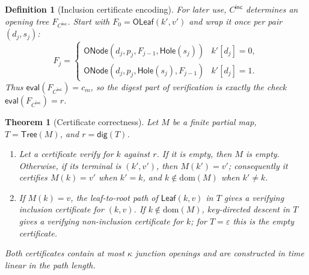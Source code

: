 \documentclass[twocolumn]{article}
\newtheorem{definition}{Definition}
\newtheorem{theorem}{Theorem}
\begin{document}
\begin{definition}[Inclusion certificate encoding]
For later use, $C^\mathsf{inc}$ determines an opening tree $F_{C^\mathsf{inc}}$. Start with $F_0=\mathsf{OLeaf}(k',v')$ and wrap it once per pair $(d_j,s_j)$:
\[
F_j=\begin{cases}
\mathsf{ONode}(d_j,p_j,F_{j-1},\mathsf{Hole}(s_j)) & k'[d_j]=0,\\
\mathsf{ONode}(d_j,p_j,\mathsf{Hole}(s_j),F_{j-1}) & k'[d_j]=1.
\end{cases}
\]
Thus $\mathsf{eval}(F_{C^\mathsf{inc}})=c_m$, so the digest part of verification is exactly the check $\mathsf{eval}(F_{C^\mathsf{inc}})=r$.
\end{definition}

\begin{theorem}[Certificate correctness]
\label{thm:inclusion-cert}
Let $M$ be a finite partial map, $T=\mathsf{Tree}(M)$, and $r=\mathsf{dig}(T)$.
\begin{enumerate}[nosep,label=(\roman*)]
  \item Let a certificate verify for $k$ against $r$. If it is empty, then $M$ is empty. Otherwise, if its terminal is $(k',v')$, then $M(k')=v'$; consequently it certifies $M(k)=v'$ when $k'=k$, and $k\notin\mathrm{dom}(M)$ when $k'\neq k$.
  \item If $M(k)=v$, the leaf-to-root path of $\mathsf{Leaf}(k,v)$ in $T$ gives a verifying inclusion certificate for $(k,v)$. If $k\notin\mathrm{dom}(M)$, key-directed descent in $T$ gives a verifying non-inclusion certificate for $k$; for $T=\varepsilon$ this is the empty certificate.
\end{enumerate}
Both certificates contain at most $\kappa$ junction openings and are constructed in time linear in the path length.
\end{theorem}
\end{document}

